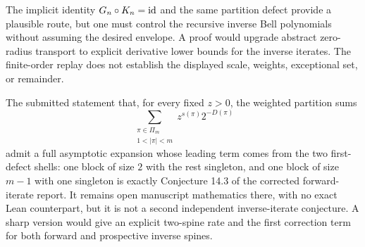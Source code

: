 The implicit identity $G_n\mathbin{\circ} K_n=\operatorname{id}$ and the same partition defect provide a
plausible route, but one must control the recursive inverse Bell polynomials without
assuming the desired envelope.  A proof would upgrade abstract zero-radius transport
to explicit derivative lower bounds for the inverse iterates.  The finite-order replay
does not establish the displayed scale, weights, exceptional set, or remainder.

\begin{warning}
\label{ii:warn:defect-duplicate}
The submitted statement that, for every fixed $z>0$, the weighted partition sums
\[
 \sum_{\substack{\pi\in\Pi_m\\1<|\pi|<m}}z^{s(\pi)}2^{-D(\pi)}
\]
admit a full asymptotic expansion whose leading term comes from the two first-defect
shells: one block of size $2$ with the rest singleton, and one block of size $m-1$ with
one singleton is exactly Conjecture 14.3 of the corrected forward-iterate report.
It remains open manuscript mathematics there, with no exact Lean counterpart, but it
is not a second independent inverse-iterate conjecture.  A sharp version would give an
explicit two-spine rate and the first correction term for both forward and prospective
inverse spines.
\end{warning}

